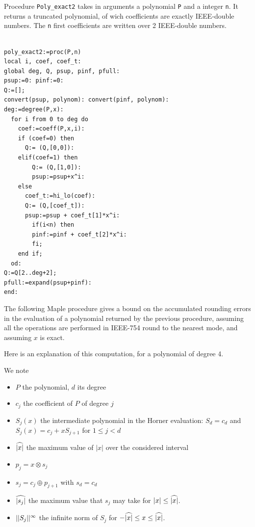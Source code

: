 Procedure \texttt{Poly\_exact2} takes in arguments a polynomial \texttt{P} and a
integer \texttt{n}. It returns a truncated polynomial, of wich coefficients
are exactly IEEE-double numbers. The \texttt{n} first coefficients are written
over 2 IEEE-double numbers.
 

\begin{lstlisting}[caption={poly\_exact2},firstnumber=1]

poly_exact2:=proc(P,n)
local i, coef, coef_t:
global deg, Q, psup, pinf, pfull:
psup:=0: pinf:=0:
Q:=[];
convert(psup, polynom): convert(pinf, polynom):
deg:=degree(P,x):
  for i from 0 to deg do
    coef:=coeff(P,x,i):
    if (coef=0) then
      Q:= (Q,[0,0]):
    elif(coef=1) then
        Q:= (Q,[1,0]):
        psup:=psup+x^i:
    else        
      coef_t:=hi_lo(coef):
      Q:= (Q,[coef_t]):
      psup:=psup + coef_t[1]*x^i:
        if(i<n) then
        pinf:=pinf + coef_t[2]*x^i:
        fi;
    end if;
  od:
Q:=Q[2..deg+2];
pfull:=expand(psup+pinf):
end:
\end{lstlisting}
\vspace{0.5cm}



The following Maple procedure gives a bound on the accumulated
rounding errors in the evaluation of a polynomial returned by the
previous procedure, assuming all the operations are performed in
IEEE-754 round to the nearest mode, and assuming $x$ is exact.

Here is an explanation of this computation, for a polynomial of degree 4.





 We note 
\begin{itemize}
\item $P$ the polynomial, $d$ its degree
\item $c_j$ the coefficient of $P$ of degree $j$
\item $S_j(x)$ the intermediate polynomial in the Horner evaluation:
  $S_d=c_d$ and $S_j(x) = c_j+xS_{j+1}$ for $1\le j <d$
\item ${\widehat{|x|}}$ the maximum value of $|x|$ over the considered interval
\item $p_j = x \otimes s_j $ 
\item $s_j =   c_j \oplus p_{j+1}$ with $s_d = c_d$ 
\item $\widehat{|s_{j}|}$ the  maximum value that $s_j$ may take for $|x|
  \le {\widehat{|x|}}$.
\item $||{S_j}||^{\infty}$ the infinite norm of $S_j$ for $-{\widehat{|x|}} \le
  x\le {\widehat{|x|}}$.
\end{itemize}

